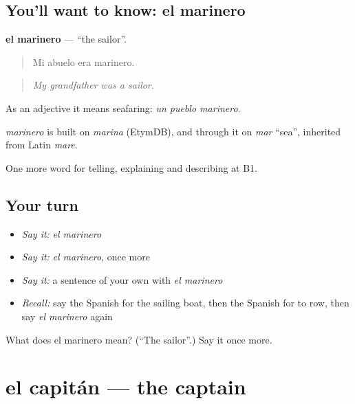 \subsection*{You'll want to know: el marinero}
\textbf{el marinero} — \textquotedblleft{}the sailor\textquotedblright{}.

\begin{quote}
Mi abuelo era marinero.
\end{quote}

\begin{quote}
\emph{My grandfather was a sailor.}
\end{quote}

As an adjective it means seafaring: \emph{un pueblo marinero}.

\begin{cousinweb}
\emph{marinero} is built on \emph{marina} (EtymDB), and through it on \emph{mar} \textquotedblleft{}sea\textquotedblright{}, inherited from Latin \emph{mare}.
\end{cousinweb}

\begin{grammarlens}[title={What you've built}]
One more word for telling, explaining and describing at B1.
\end{grammarlens}

\subsection*{Your turn}
\begin{itemize}
\raggedright
  \item \emph{Say it:} \emph{el marinero}
  \item \emph{Say it:} \emph{el marinero}, once more
  \item \emph{Say it:} a sentence of your own with \emph{el marinero}
  \item \emph{Recall:} say the Spanish for the sailing boat, then the Spanish for to row, then say \emph{el marinero} again
\end{itemize}

\begin{tcolorbox}[breakable,colback=teal!4,colframe=teal!35!black,title={Before you move on}]
What does el marinero mean? (\textquotedblleft{}The sailor\textquotedblright{}.) Say it once more.
\end{tcolorbox}
\section[el capitán]{el capitán — the captain}

